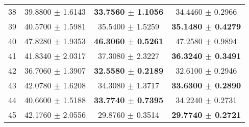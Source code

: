 \documentclass[twocolumn]{article}
\begin{document}
\begin{table}[!htb]
\begin{tabular}{|c||c|c|c|}
38 & 39.8800 $\pm$ 1.6143 & \textbf{33.7560 $\pm$ 1.1056} & 34.4460 $\pm$ 0.2966\\
39 & 40.5700 $\pm$ 1.5981 & 35.5400 $\pm$ 1.5259 & \textbf{35.1480 $\pm$ 0.4279}\\
40 & 47.8280 $\pm$ 1.9353 & \textbf{46.3060 $\pm$ 0.5261} & 47.2580 $\pm$ 0.9894\\
41 & 41.8340 $\pm$ 2.0317 & 37.3080 $\pm$ 2.3227 & \textbf{36.3240 $\pm$ 0.3491}\\
42 & 36.7060 $\pm$ 1.3907 & \textbf{32.5580 $\pm$ 0.2189} & 32.6100 $\pm$ 0.2946\\
43 & 42.0780 $\pm$ 1.6208 & 34.3080 $\pm$ 1.3717 & \textbf{33.6300 $\pm$ 0.2890}\\
44 & 40.6600 $\pm$ 1.5188 & \textbf{33.7740 $\pm$ 0.7395} & 34.2240 $\pm$ 0.2731\\
45 & 42.1760 $\pm$ 2.0556 & 29.8760 $\pm$ 0.3514 & \textbf{29.7740 $\pm$ 0.2721}\\
\hline\hline
\end{tabular}
\end{table}
\end{document}
